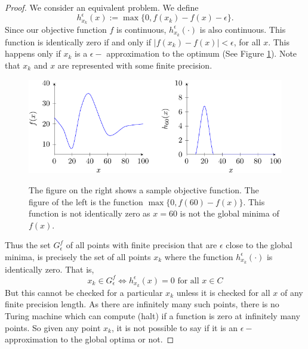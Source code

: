 	\begin{proof}				
		We consider an equivalent problem. We define
		\begin{equation*}
			h_{x_k}^{\epsilon}(x) := \max \{0,f(x_k)-f(x)-\epsilon\}.
		\end{equation*}
		Since our objective function $f$ is continuous, $h_{x_k}^{\epsilon}(\cdot)$ is also continuous. 
		This function is identically zero if and only if $|f(x_k) - f(x)| < \epsilon$, for all $x$. This happens only if $x_k$ is a $\epsilon-$ approximation to the optimum (See Figure \ref{illusfig}). Note that $x_k$ and $x$ are represented with some finite precision. %
		\begin{figure}[!ht]
			\centering
			\includegraphics[alt={Two plots of function graphs}]{fig1-crop.pdf}
			\caption{The figure on the right shows a sample objective function. The figure of the left is the function $ \max \{0,f(60)-f(x) \}$. This function  is not identically zero as $x=60$ is not the global minima of $f(x)$.}
			\label{illusfig}
		\end{figure}
		
		
		Thus the set $G^f_{\epsilon}$ of all points with finite precision that are $\epsilon$ close to the global minima, is precisely the set of all points $x_k$ where the function $h_{x_k}^{\epsilon}(\cdot)$ is identically zero.
		That is, 
		\[ x_k \in G^f_{\epsilon} \Leftrightarrow h_{x_k}^{\epsilon}(x) = 0 \mbox{ for all } x \in C \]
		But this cannot be checked for a particular $x_k$ unless it is checked for all $x$ of any finite precision length. As there are infinitely many such points, there is no Turing machine which can compute (halt) if a function is zero at infinitely many points.
		So given any point $x_k$, it is not possible to say if it is an $\epsilon-$ approximation to the global optima or not.
		\end{proof}
		
